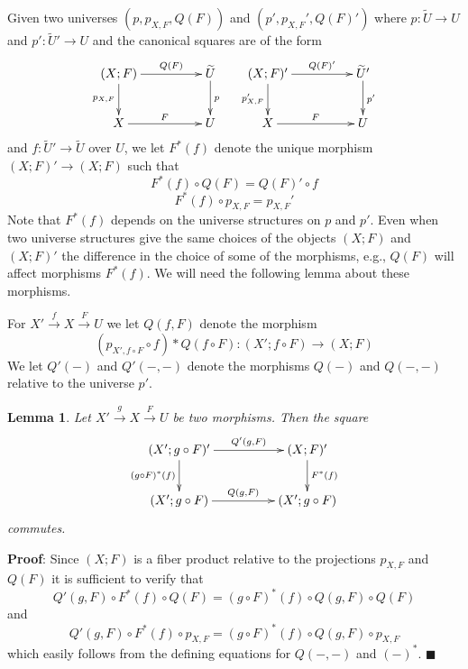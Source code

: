 \documentclass[12pt]{article}
\numberwithin{equation}{section}
\newenvironment{eq}{\begin{equation}}{\end{equation}}
\newenvironment{myproof}{{\bf Proof}:}{$\blacksquare$ \vskip 5mm }
\newtheorem{lemma}[proposition]{Lemma}
\newcommand{\llabel}[1]{\label{#1}}
\newcommand{\sr}{\rightarrow}
\newcommand{\wt}{\widetilde}
\newcommand{\spc}{{\,\,\,\,\,\,\,}}
\begin{document}
Given two universes $(p,p_{X,F},Q(F))$ and $(p',p_{X,F}',Q(F)')$ where
$p:\wt{U}\sr U$ and $p':\wt{U}'\sr U$ and the canonical squares are of the form
%
$$
\begin{xy}
          \xymatrix@C=4pc{ (X;F) \ar[r]^-{Q(F)} \ar[d]_{p_{X,F}} & \wt{U}
            \ar[d]^{p}\\ X \ar[r]^{F} & U }
\end{xy}
\spc
\begin{xy}
          \xymatrix@C=4pc{ (X;F)' \ar[r]^-{Q(F)'} \ar[d]_{p'_{X,F}} & \wt{U}'
            \ar[d]^{p'}\\ X \ar[r]^{F} & U }
\end{xy}
$$
%
and $f:\wt{U}'\sr \wt{U}$ over $U$, we let $F^*(f)$ denote the unique morphism
$(X;F)'\sr (X;F)$ such that
%
\begin{eq}\llabel{2015.04.08.eq3}
F^*(f)\circ Q(F)=Q(F)'\circ f
\end{eq}
%
\begin{eq}\llabel{2015.04.08.eq4}
F^*(f)\circ p_{X,F}=p_{X,F}'
\end{eq}
%
Note that $F^*(f)$ depends on the universe structures on $p$ and $p'$. Even
when two universe structures give the same choices of the objects $(X;F)$ and
$(X;F)'$ the difference in the choice of some of the morphisms, e.g., $Q(F)$
will affect morphisms $F^*(f)$. We will need the following lemma about these
morphisms.

For $X'\stackrel{f}{\sr}X \stackrel{F}{\sr}U$ we let $Q(f,F)$ denote the
morphism
%
$$(p_{X',f\circ F}\circ f)*Q(f\circ F):(X';f\circ F)\sr (X;F)$$
%
We let $Q'(-)$ and $Q'(-,-)$ denote the morphisms $Q(-)$ and $Q(-,-)$ relative
to the universe $p'$.
%
\begin{lemma}
\llabel{2015.04.20.l1} Let $X'\stackrel{g}{\sr}X\stackrel{F}{\sr}U$ be two
morphisms. Then the square
%
$$
\begin{xy}
          \xymatrix@C=4pc{ (X';g\circ F)' \ar[r]^-{Q'(g,F)} \ar[d]_{(g\circ
              F)^*(f)} & (X;F)' \ar[d]^{F^*(f)}\\ (X';g\circ F) \ar[r]^{Q(g,F)}
            & (X';g\circ F) }
\end{xy}
$$
%
commutes.
%
\end{lemma}
%
\begin{myproof}
Since $(X;F)$ is a fiber product relative to the projections $p_{X,F}$ and
$Q(F)$ it is sufficient to verify that
%
$$Q'(g,F)\circ F^*(f)\circ Q(F)=(g\circ F)^*(f) \circ Q(g,F)\circ Q(F)$$
%
and
%
$$Q'(g,F)\circ F^*(f)\circ p_{X,F}=(g\circ F)^*(f) \circ Q(g,F)\circ p_{X,F}$$
%
which easily follows from the defining equations for $Q(-,-)$ and $(-)^*$.
\end{myproof}
\end{document}
